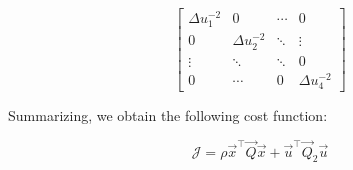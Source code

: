 \begin{equation}
	\begin{bmatrix}
		\Delta u_1^{-2} & 0 & \cdots & 0 \\
		0 & \Delta u_2^{-2} & \ddots & \vdots \\
		\vdots & \ddots & \ddots & 0 \\
		0 & \cdots & 0 & \Delta u_{4}^{-2} 
	\end{bmatrix}
\end{equation}

Summarizing, we obtain the following cost function:

\begin{equation}
	\mathcal{J} = \rho \vec{x}^\intercal \vec{Q} \vec{x} + \vec{u}^\intercal \vec{Q}_2 \vec{u}
\end{equation}